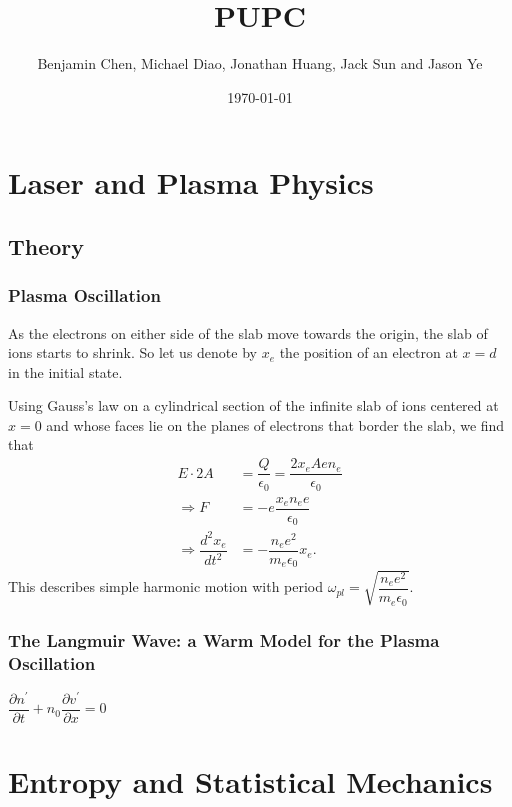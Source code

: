 \documentclass{paper}
\begin{document}
\setcounter{page}{-1}

\title{PUPC}
\author{Benjamin Chen, Michael Diao, Jonathan Huang, Jack Sun and Jason Ye}
\date{\today}
\maketitle

\tableofcontents
\fancyfoot{}

\newpage

\chapter{Laser and Plasma Physics}

\section{Theory}
\subsection{Plasma Oscillation}

As the electrons on either side of the slab move towards the origin, the slab of ions starts to shrink. So let us denote by $x_e$ the position of an electron at $x = d$ in the initial state.

Using Gauss's law on a cylindrical section of the infinite slab of ions centered at $x=0$ and whose faces lie on the planes of electrons that border the slab, we find that
\begin{align*}
    E\cdot 2A &= \dfrac{Q}{\epsilon_0} = \dfrac{2x_eAen_e}{\epsilon_0}\\
    \Rightarrow  F &= -e\dfrac{x_en_ee}{\epsilon_0}\\
    \Rightarrow \dfrac{d^2x_e}{dt^2} &= -\dfrac{n_ee^2}{m_e\epsilon_0}x_e.
\end{align*}
This describes simple harmonic motion with period $\omega_{pl} = \sqrt{\dfrac{n_ee^2}{m_e\epsilon_0}}$.

\subsection{The Langmuir Wave: a Warm Model for the Plasma Oscillation}

$\dfrac{\partial n^\prime}{\partial t} + n_0\dfrac{\partial v^\prime}{\partial x} = 0$ %


\chapter{Entropy and Statistical Mechanics}
\end{document}
